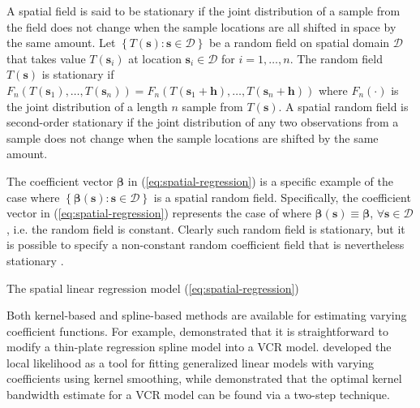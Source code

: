 \documentclass[authoryear, review, 11pt]{elsarticle}
\begin{document}
	A spatial field is said to be stationary if the joint distribution of a sample from the field does not change when the sample locations are all shifted in space by the same amount. Let $\left\{T(\bm{s}) : \bm{s} \in \mathcal{D}\right\}$ be a random field on spatial domain $\mathcal{D}$ that takes value $T(\bm{s}_i)$ at location $\bm{s}_i \in \mathcal{D}$ for $i = 1, \dots, n$. The random field $T(\bm{s})$ is stationary if $F_n\left(T(\bm{s}_1), \dots, T(\bm{s}_n)\right) = F_n\left(T(\bm{s}_1+\bm{h}), \dots, T(\bm{s}_n+\bm{h})\right)$ where $F_n(\cdot)$ is the joint distribution of a length $n$ sample from $T(\bm{s})$. A spatial random field is second-order stationary if the joint distribution of any two observations from a sample does not change when the sample locations are shifted by the same amount.
	
	The coefficient vector $\bm{\beta}$ in (\ref{eq:spatial-regression}) is a specific example of the case where $\left\{\bm{\beta}(\bm{s}) : \bm{s} \in \mathcal{D}\right\}$ is a spatial random field. Specifically, the coefficient vector in (\ref{eq:spatial-regression}) represents the case of where $\bm{\beta}(\bm{s}) \equiv \bm{\beta}$, $\forall \bm{s} \in \mathcal{D}$, i.e. the random field is constant. Clearly such random field is stationary, but it is possible to specify a non-constant random coefficient field that is nevertheless stationary \citep{Gelfand:2003}. 
	
	The spatial linear regression model (\ref{eq:spatial-regression}) 


	Both kernel-based and spline-based methods are available for estimating varying coefficient functions. For example, \cite{Wood:2006} demonstrated that it is straightforward to modify a thin-plate regression spline model into a VCR model. \cite{Loader:1999} developed the local likelihood as a tool for fitting generalized linear models with varying coefficients using kernel smoothing, while \cite{Fan:1999} demonstrated that the optimal kernel bandwidth estimate for a VCR model can be found via a two-step technique.
	
\end{document}
